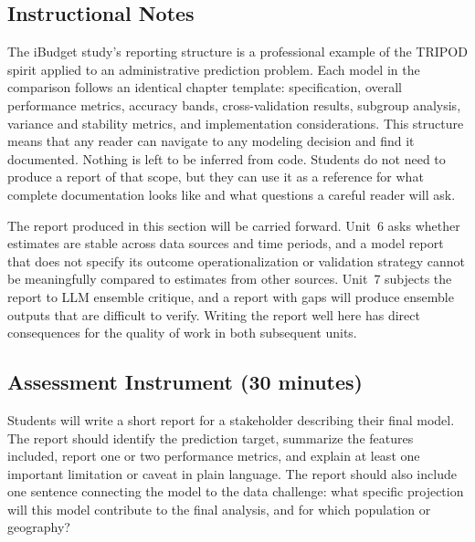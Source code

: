 \subsection{Instructional Notes}

The iBudget study's reporting structure is a professional example of
the TRIPOD spirit applied to an administrative prediction problem.
Each model in the comparison follows an identical chapter template:
specification, overall performance metrics, accuracy bands,
cross-validation results, subgroup analysis, variance and stability
metrics, and implementation considerations. This structure means
that any reader can navigate to any modeling decision and find it
documented. Nothing is left to be inferred from code. Students do
not need to produce a report of that scope, but they can use it as
a reference for what complete documentation looks like and what
questions a careful reader will ask.

The report produced in this section will be carried forward. Unit~6
asks whether estimates are stable across data sources and time
periods, and a model report that does not specify its outcome
operationalization or validation strategy cannot be meaningfully
compared to estimates from other sources. Unit~7 subjects the report
to LLM ensemble critique, and a report with gaps will produce
ensemble outputs that are difficult to verify. Writing the report
well here has direct consequences for the quality of work in both
subsequent units.

\subsection{Assessment Instrument (30 minutes)}

Students will write a short report for a stakeholder describing
their final model. The report should identify the prediction target,
summarize the features included, report one or two performance
metrics, and explain at least one important limitation or caveat in
plain language. The report should also include one sentence
connecting the model to the data challenge: what specific projection
will this model contribute to the final analysis, and for which
population or geography?


